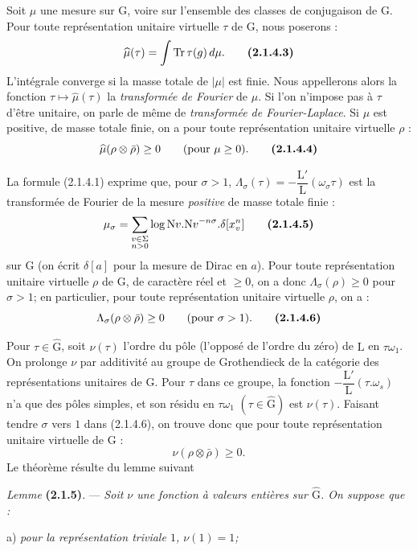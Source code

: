 \documentclass[11pt,leqno]{article}
\begin{document}
Soit \(\mu\) une mesure sur \(\mathrm{G}\), voire sur l’ensemble des classes de conjugaison de \(\mathrm{G}\). Pour toute représentation unitaire virtuelle \(\tau\) de \(\mathrm{G}\), nous poserons :
\[
\widehat{\mu}(\tau)=\int\operatorname{Tr}\tau(g)\,d\mu.
\tag*{\textbf{(2.1.4.3)}}
\]
L’intégrale converge si la masse totale de \(|\mu|\) est finie. Nous appellerons alors la fonction \(\tau\mapsto\widehat{\mu}(\tau)\) la \textit{transformée de Fourier} de \(\mu\). Si l’on n’impose pas à \(\tau\) d’être unitaire, on parle de même de \textit{transformée de Fourier-Laplace}. Si \(\mu\) est positive, de masse totale finie, on a pour toute représentation unitaire virtuelle \(\rho\) :
\[
\widehat{\mu}(\rho\otimes\bar{\rho})\geq0
\qquad(\text{pour }\mu\geq0).
\tag*{\textbf{(2.1.4.4)}}
\]

La formule (2.1.4.1) exprime que, pour \(\sigma>1\), \(\Lambda_\sigma(\tau)=-\dfrac{\mathrm{L}'}{\mathrm{L}}(\omega_\sigma\tau)\) est la transformée de Fourier de la mesure \textit{positive} de masse totale finie :
\[
\mu_\sigma
 =\sum_{\substack{v\in\Sigma\\ n>0}}
   \log\mathrm{N}v.\mathrm{N}v^{-n\sigma}.\delta[x_v^n]
\tag*{\textbf{(2.1.4.5)}}
\]
sur \(\mathrm{G}\) (on écrit \(\delta[a]\) pour la mesure de Dirac en \(a\)). Pour toute représentation unitaire virtuelle \(\rho\) de \(\mathrm{G}\), de caractère réel et \(\geq0\), on a donc \(\Lambda_\sigma(\rho)\geq0\) pour \(\sigma>1\); en particulier, pour toute représentation unitaire virtuelle \(\rho\), on a :
\[
\Lambda_\sigma(\rho\otimes\bar{\rho})\geq0
\qquad(\text{pour }\sigma>1).
\tag*{\textbf{(2.1.4.6)}}
\]

Pour \(\tau\in\widehat{\mathrm{G}}\), soit \(\nu(\tau)\) l’ordre du pôle (l’opposé de l’ordre du zéro) de \(\mathrm{L}\) en \(\tau\omega_1\). On prolonge \(\nu\) par additivité au groupe de Grothendieck de la catégorie des représentations unitaires de \(\mathrm{G}\). Pour \(\tau\) dans ce groupe, la fonction \(-\dfrac{\mathrm{L}'}{\mathrm{L}}(\tau.\omega_s)\) n’a que des pôles simples, et son résidu en \(\tau\omega_1\) \((\tau\in\widehat{\mathrm{G}})\) est \(\nu(\tau)\). Faisant tendre \(\sigma\) vers \(1\) dans (2.1.4.6), on trouve donc que pour toute représentation unitaire virtuelle de \(\mathrm{G}\) :
\[
\nu(\rho\otimes\bar{\rho})\geq0.
\]
Le théorème résulte du lemme suivant

\textit{Lemme} \textbf{(2.1.5)}. — \textit{Soit \(\nu\) une fonction à valeurs entières sur \(\widehat{\mathrm{G}}\). On suppose que :}

\noindent a) \textit{pour la représentation triviale \(1\), \(\nu(1)=1\);}
\end{document}
